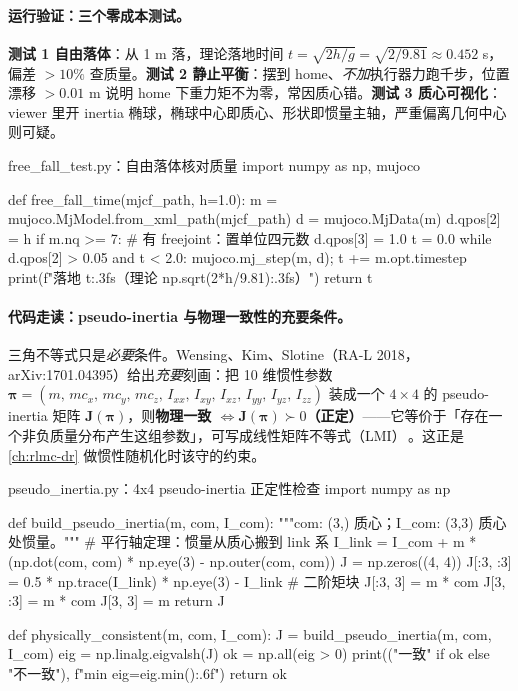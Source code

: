 \paragraph{运行验证：三个零成本测试。}\textbf{测试 1 自由落体}：从 1 m 落，理论落地时间 $t=\sqrt{2h/g}=\sqrt{2/9.81}\approx0.452$ s，偏差 $>10\%$ 查质量。\textbf{测试 2 静止平衡}：摆到 home、\emph{不加}执行器力跑千步，位置漂移 $>0.01$ m 说明 home 下重力矩不为零，常因质心错。\textbf{测试 3 质心可视化}：viewer 里开 inertia 椭球，椭球中心即质心、形状即惯量主轴，严重偏离几何中心则可疑。

\begin{codebox}[Python]{free\_fall\_test.py：自由落体核对质量}
import numpy as np, mujoco

def free_fall_time(mjcf_path, h=1.0):
    m = mujoco.MjModel.from_xml_path(mjcf_path)
    d = mujoco.MjData(m)
    d.qpos[2] = h
    if m.nq >= 7:                      # 有 freejoint：置单位四元数
        d.qpos[3] = 1.0
    t = 0.0
    while d.qpos[2] > 0.05 and t < 2.0:
        mujoco.mj_step(m, d); t += m.opt.timestep
    print(f"落地 {t:.3f}s（理论 {np.sqrt(2*h/9.81):.3f}s）")
    return t
\end{codebox}

\paragraph{代码走读：pseudo-inertia 与物理一致性的充要条件。}三角不等式只是\emph{必要}条件。Wensing、Kim、Slotine（RA-L 2018，arXiv:1701.04395）给出\emph{充要}刻画：把 10 维惯性参数 $\boldsymbol\pi=(m,\,mc_x,\,mc_y,\,mc_z,\,I_{xx},\,I_{xy},\,I_{xz},\,I_{yy},\,I_{yz},\,I_{zz})$ 装成一个 $4\times4$ 的 pseudo-inertia 矩阵 $\mathbf{J}(\boldsymbol\pi)$，则\textbf{物理一致 $\iff \mathbf{J}(\boldsymbol\pi)\succ 0$（正定）}——它等价于「存在一个非负质量分布产生这组参数」，可写成线性矩阵不等式（LMI）\,\cite{wensing2018lmi}。这正是 \cref{ch:rlmc-dr} 做惯性随机化时该守的约束。

\begin{codebox}[Python]{pseudo\_inertia.py：4x4 pseudo-inertia 正定性检查}
import numpy as np

def build_pseudo_inertia(m, com, I_com):
    """com: (3,) 质心；I_com: (3,3) 质心处惯量。"""
    # 平行轴定理：惯量从质心搬到 link 系
    I_link = I_com + m * (np.dot(com, com) * np.eye(3) - np.outer(com, com))
    J = np.zeros((4, 4))
    J[:3, :3] = 0.5 * np.trace(I_link) * np.eye(3) - I_link   # 二阶矩块
    J[:3, 3] = m * com
    J[3, :3] = m * com
    J[3, 3] = m
    return J

def physically_consistent(m, com, I_com):
    J = build_pseudo_inertia(m, com, I_com)
    eig = np.linalg.eigvalsh(J)
    ok = np.all(eig > 0)
    print(("一致" if ok else "不一致"), f"min eig={eig.min():.6f}")
    return ok
\end{codebox}

